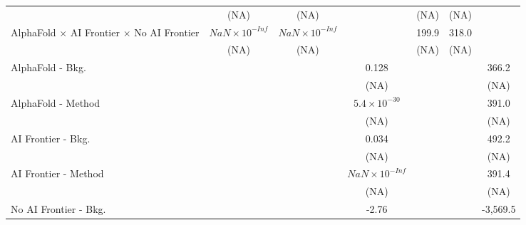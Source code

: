 \begin{tabular}{lcccccc}
                                                                              & (NA)                   & (NA)                   &                        & (NA)    & (NA)   &   \\   
   AlphaFold $\times$ AI Frontier $\times$ No AI Frontier                     & $NaN\times 10^{-Inf}$  & $NaN\times 10^{-Inf}$  &                        & 199.9   & 318.0  &   \\   
                                                                              & (NA)                   & (NA)                   &                        & (NA)    & (NA)   &   \\   
   AlphaFold - Bkg.                                                           &                        &                        & 0.128                  &         &        & 366.2\\   
                                                                              &                        &                        & (NA)                   &         &        & (NA)\\   
   AlphaFold - Method                                                         &                        &                        & $5.4\times 10^{-30}$   &         &        & 391.0\\   
                                                                              &                        &                        & (NA)                   &         &        & (NA)\\   
   AI Frontier - Bkg.                                                         &                        &                        & 0.034                  &         &        & 492.2\\   
                                                                              &                        &                        & (NA)                   &         &        & (NA)\\   
   AI Frontier - Method                                                       &                        &                        & $NaN\times 10^{-Inf}$  &         &        & 391.4\\   
                                                                              &                        &                        & (NA)                   &         &        & (NA)\\   
   No AI Frontier - Bkg.                                                      &                        &                        & -2.76                  &         &        & -3,569.5\\   

\end{tabular}

